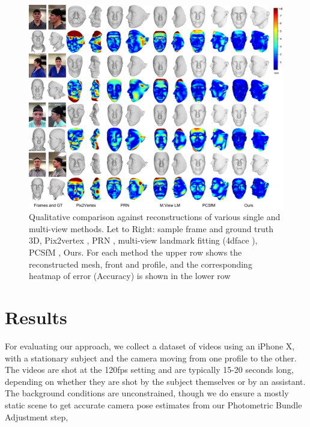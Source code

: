 \documentclass[10pt,twocolumn,letterpaper]{article}
\begin{document}



\begin{figure}
\begin{center}
   \includegraphics[width=0.95\linewidth]{images/qual_figure.pdf}
\end{center}
  \caption{Qualitative comparison against reconstructions of various single and multi-view methods. Let to Right: sample frame and ground truth 3D, Pix2vertex \cite{sela2017unrestricted}, PRN \cite{feng2018joint}, multi-view landmark fitting (4dface \cite{huber2016multiresolution}), PCSfM \cite{hernandez2017accurate}, Ours. For each method the upper row shows the reconstructed mesh, front and profile, and the corresponding heatmap of error (Accuracy) is shown in the lower row }
\label{fig:results}
\end{figure}

\section{Results}

For evaluating our approach, we collect a dataset of videos using an iPhone X, with a stationary subject and the camera moving from one profile to the other. The videos are shot at the 120fps setting and are typically 15-20 seconds long, depending on whether they are shot by the subject themselves or by an assistant. The background conditions are unconstrained, though we do ensure a mostly static scene to get accurate camera pose estimates from our Photometric Bundle Adjustment step,
\end{document}
